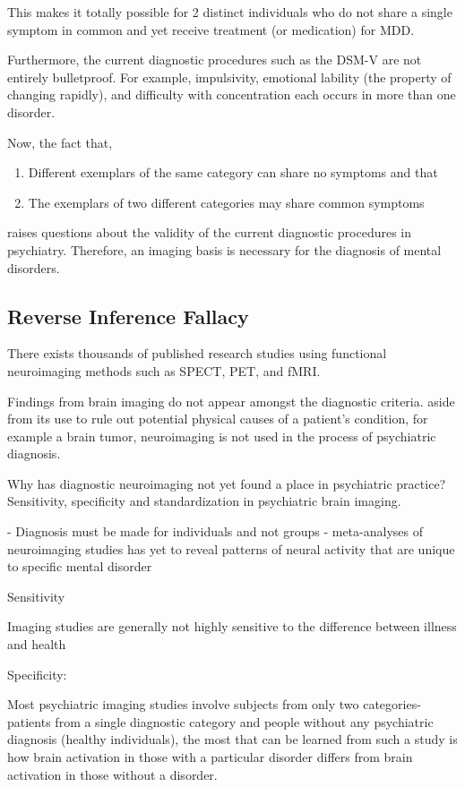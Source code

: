 \documentclass{article}
\begin{document}
This makes it totally possible for 2 distinct individuals who do not
share a single symptom in common and yet receive treatment (or
medication) for MDD.

Furthermore, the current diagnostic procedures such as the DSM-V are
not entirely bulletproof. For example, impulsivity, emotional lability
(the property of changing rapidly), and difficulty with concentration
each occurs in more than one disorder.

Now, the fact that,

\begin{enumerate}[nosep]
  \item Different exemplars of the same category can share no
    symptoms and that
  \item The exemplars of two different categories may share common
    symptoms
\end{enumerate}

raises questions about the validity of the current diagnostic
procedures in psychiatry. Therefore, an imaging basis is necessary for
the diagnosis of mental disorders.

\subsection{Reverse Inference Fallacy}

There exists thousands of published research studies using
functional neuroimaging methods such as SPECT, PET, and fMRI.

Findings from brain imaging do not appear amongst the diagnostic
criteria. aside from its use to rule out potential physical causes
of a patient's condition, for example a brain tumor, neuroimaging
is not used in the process of psychiatric diagnosis.

Why has diagnostic neuroimaging not yet found a place in
psychiatric practice? Sensitivity, specificity and standardization
in psychiatric brain imaging.

    - Diagnosis must be made for individuals and not groups
    - meta-analyses of neuroimaging studies has yet to reveal
      patterns of neural activity that are unique to specific
      mental disorder

Sensitivity

Imaging studies are generally not highly sensitive to the
difference between illness and health

Specificity:

Most psychiatric imaging studies involve subjects from only two
categories- patients from a single diagnostic category and people
without any psychiatric diagnosis (healthy individuals), the most
that can be learned from such a study is how brain activation in
those with a particular disorder differs from brain activation in
those without a disorder.
\end{document}
